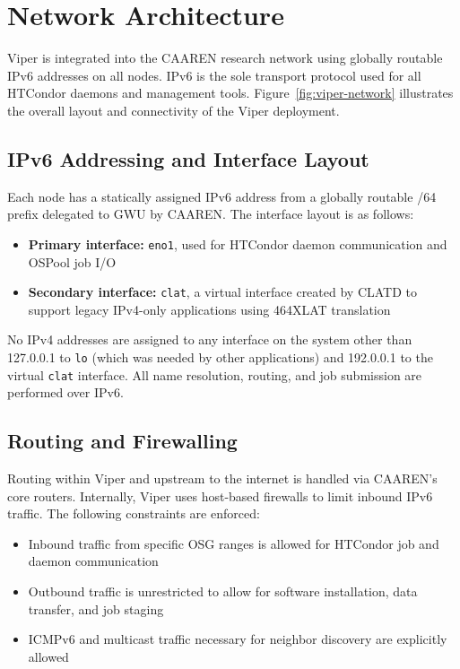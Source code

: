 \documentclass[11pt]{article}
\begin{document}


\section{Network Architecture}

Viper is integrated into the CAAREN research network using globally routable IPv6 addresses on all nodes. IPv6 is the sole transport protocol used for all HTCondor daemons and management tools. Figure~\ref{fig:viper-network} illustrates the overall layout and connectivity of the Viper deployment.

\subsection{IPv6 Addressing and Interface Layout}

Each node has a statically assigned IPv6 address from a globally routable /64 prefix delegated to GWU by CAAREN. The interface layout is as follows:
\begin{itemize}[leftmargin=*,label=--,itemsep=1pt]
    \item \textbf{Primary interface:} \texttt{eno1}, used for HTCondor daemon communication and OSPool job I/O
    \item \textbf{Secondary interface:} \texttt{clat}, a virtual interface created by CLATD to support legacy IPv4-only applications using 464XLAT translation
\end{itemize}

No IPv4 addresses are assigned to any interface on the system other than 127.0.0.1 to \texttt{lo} (which was needed by other applications) and  192.0.0.1 to the virtual \texttt{clat} interface. All name resolution, routing, and job submission are performed over IPv6.

\subsection{Routing and Firewalling}

Routing within Viper and upstream to the internet is handled via CAAREN’s core routers. Internally, Viper uses host-based firewalls to limit inbound IPv6 traffic. The following constraints are enforced:
\begin{itemize}[leftmargin=*,label=--,itemsep=1pt]
    \item Inbound traffic from specific OSG ranges is allowed for HTCondor job and daemon communication
    \item Outbound traffic is unrestricted to allow for software installation, data transfer, and job staging
    \item ICMPv6 and multicast traffic necessary for neighbor discovery are explicitly allowed
\end{itemize}
\end{document}
